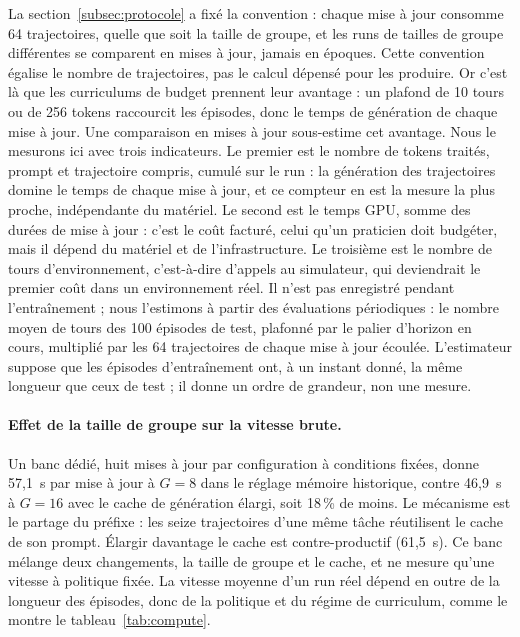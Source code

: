 \documentclass[11pt,a4paper]{article}
\begin{document}
La section~\ref{subsec:protocole} a fixé la convention : chaque mise à jour consomme 64 trajectoires, quelle que soit la taille de groupe, et les runs de tailles de groupe différentes se comparent en mises à jour, jamais en époques. Cette convention égalise le nombre de trajectoires, pas le calcul dépensé pour les produire. Or c'est là que les curriculums de budget prennent leur avantage : un plafond de 10 tours ou de 256 tokens raccourcit les épisodes, donc le temps de génération de chaque mise à jour. Une comparaison en mises à jour sous-estime cet avantage. Nous le mesurons ici avec trois indicateurs. Le premier est le nombre de tokens traités, prompt et trajectoire compris, cumulé sur le run : la génération des trajectoires domine le temps de chaque mise à jour, et ce compteur en est la mesure la plus proche, indépendante du matériel. Le second est le temps GPU, somme des durées de mise à jour : c'est le coût facturé, celui qu'un praticien doit budgéter, mais il dépend du matériel et de l'infrastructure. Le troisième est le nombre de tours d'environnement, c'est-à-dire d'appels au simulateur, qui deviendrait le premier coût dans un environnement réel. Il n'est pas enregistré pendant l'entraînement ; nous l'estimons à partir des évaluations périodiques : le nombre moyen de tours des 100 épisodes de test, plafonné par le palier d'horizon en cours, multiplié par les 64 trajectoires de chaque mise à jour écoulée. L'estimateur suppose que les épisodes d'entraînement ont, à un instant donné, la même longueur que ceux de test ; il donne un ordre de grandeur, non une mesure.

\paragraph{Effet de la taille de groupe sur la vitesse brute.} Un banc dédié, huit mises à jour par configuration à conditions fixées, donne 57{,}1~s par mise à jour à $G=8$ dans le réglage mémoire historique, contre 46{,}9~s à $G=16$ avec le cache de génération élargi, soit 18\,\% de moins. Le mécanisme est le partage du préfixe : les seize trajectoires d'une même tâche réutilisent le cache de son prompt. Élargir davantage le cache est contre-productif (61{,}5~s). Ce banc mélange deux changements, la taille de groupe et le cache, et ne mesure qu'une vitesse à politique fixée. La vitesse moyenne d'un run réel dépend en outre de la longueur des épisodes, donc de la politique et du régime de curriculum, comme le montre le tableau~\ref{tab:compute}.
\end{document}
